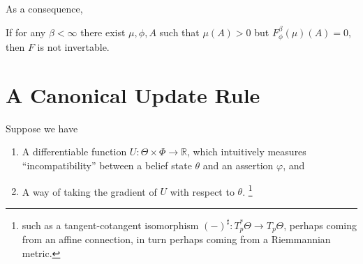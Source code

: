 \documentclass{article}
\begin{document}


As a consequence,
\begin{coro}
    If for any $\beta < \infty$ there exist $\mu, \phi, A$ such that
    $\mu(A) > 0$  but $F^{\beta}_\phi(\mu)(A) = 0$, then $F$ is not invertable.
\end{coro}


%

\section{A Canonical Update Rule}
Suppose we have 
\begin{enumerate}[nosep] 
    \item A differentiable function $U : \Theta \times \Phi  \to \mathbb R$, which intuitively measures ``incompatibility'' between a belief state $\theta$ and an assertion $\varphi$, and
    \item
        A way of taking the gradient of $U$ with respect to $\theta$.%
            \footnote{
            such as a tangent-cotangent isomorphism $(-)^\sharp : T^*_p\Theta \to T_p \Theta$, perhaps coming from an affine connection, in turn perhaps coming from a Riemmannian metric.}
\end{enumerate}
\def\GD#1{\mathtt{GF}[#1]}
\def\NGD#1{\mathtt{NGF}[#1]}
\end{document}
